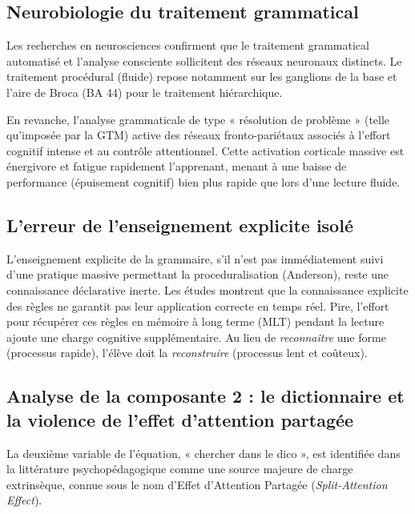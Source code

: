 \subsection{Neurobiologie du traitement grammatical}

Les recherches en neurosciences confirment que le traitement grammatical automatisé et l'analyse
consciente sollicitent des réseaux neuronaux distincts. Le traitement procédural (fluide) repose
notamment sur les ganglions de la base et l'aire de Broca (BA 44) pour le traitement
hiérarchique.\cite{II-1-3-ref8}

En revanche, l'analyse grammaticale de type « résolution de problème » (telle qu'imposée par la GTM)
active des réseaux fronto-pariétaux associés à l'effort cognitif intense et au contrôle
attentionnel.\cite{II-1-3-ref8} Cette activation corticale massive est énergivore et fatigue
rapidement l'apprenant, menant à une baisse de performance (épuisement cognitif) bien plus rapide
que lors d'une lecture fluide.



\subsection{L'erreur de l'enseignement explicite isolé}

L'enseignement explicite de la grammaire, s'il n'est pas immédiatement suivi d'une pratique massive
permettant la \og proceduralisation\fg{} (Anderson), reste une connaissance déclarative inerte. Les
études montrent que la connaissance explicite des règles ne garantit pas leur application correcte
en temps réel.\cite{II-1-3-ref16} Pire, l'effort pour récupérer ces règles en mémoire à long terme
(MLT) pendant la lecture ajoute une charge cognitive supplémentaire. Au lieu de \textit{reconnaître}
une forme (processus rapide), l'élève doit la \textit{reconstruire} (processus lent et
coûteux).\cite{II-1-3-ref17}



\subsection{Analyse de la composante 2 : le dictionnaire et la violence de l'effet d'attention partagée}

La deuxième variable de l'équation, « chercher dans le dico », est identifiée dans la littérature
psychopédagogique comme une source majeure de charge extrinsèque, connue sous le nom d'Effet
d'Attention Partagée (\textit{Split-Attention Effect}).



